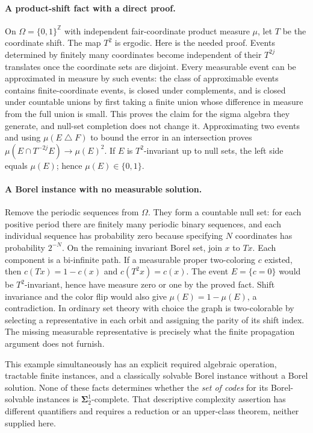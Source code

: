 \documentclass[11pt]{article}
\begin{document}
\paragraph{A product-shift fact with a direct proof.}
On $\Omega=\{0,1\}^{\mathbb Z}$ with independent fair-coordinate product
measure $\mu$, let $T$ be the coordinate shift. The map $T^2$ is ergodic.
Here is the needed proof. Events determined by finitely many coordinates become
independent of their $T^{2j}$ translates once the coordinate sets are disjoint.
Every measurable event can be approximated in measure by such events: the
class of approximable events contains finite-coordinate events, is closed under
complements, and is closed under countable unions by first taking a finite union
whose difference in measure from the full union is small. This proves the
claim for the sigma algebra they generate, and null-set completion does not
change it. Approximating two events and using
$\mu(E\mathbin\triangle F)$ to bound the error in an intersection proves
$\mu(E\cap T^{-2j}E)\to\mu(E)^2$.
If $E$ is $T^2$-invariant up to null sets, the left side equals $\mu(E)$;
hence $\mu(E)\in\{0,1\}$.

\paragraph{A Borel instance with no measurable solution.}
Remove the periodic sequences from $\Omega$. They form a countable null set:
for each positive period there are finitely many periodic binary sequences,
and each individual sequence has probability zero because specifying $N$
coordinates has probability $2^{-N}$. On the remaining invariant Borel set,
join $x$ to $Tx$. Each component is a bi-infinite path.
If a measurable proper two-coloring $c$ existed, then
$c(Tx)=1-c(x)$ and $c(T^2x)=c(x)$.
The event $E=\{c=0\}$ would be $T^2$-invariant, hence have measure zero or
one by the proved fact. Shift invariance and the color flip would also give
$\mu(E)=1-\mu(E)$, a contradiction.
In ordinary set theory with choice the graph is two-colorable by selecting a
representative in each orbit and assigning the parity of its shift index.
The missing measurable representative is precisely what the finite propagation
argument does not furnish.

This example simultaneously has an explicit required algebraic operation,
tractable finite instances, and a classically solvable Borel instance without a
Borel solution. None of these facts determines whether the \emph{set of codes}
for its Borel-solvable instances is $\boldsymbol\Sigma^1_2$-complete.
That descriptive complexity assertion has different quantifiers and requires
a reduction or an upper-class theorem, neither supplied here.
\end{document}
